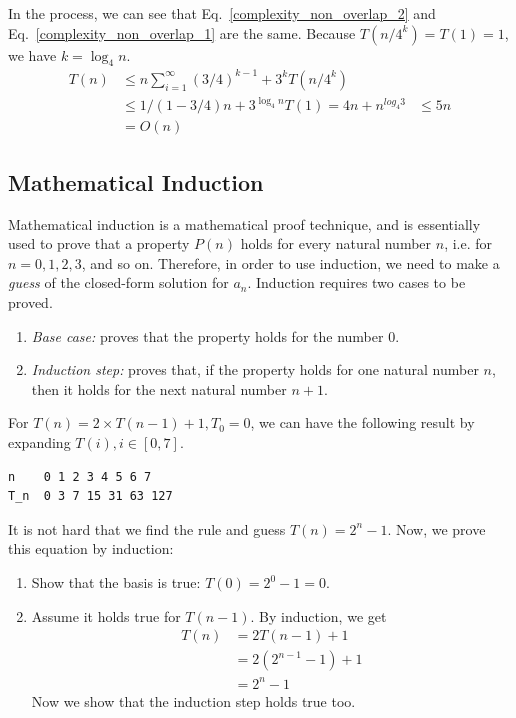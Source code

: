 \documentclass[../main.tex]{subfiles}
\begin{document}
In the process, we can see that Eq.~\ref{complexity_non_overlap_2} and Eq.~\ref{complexity_non_overlap_1} are the same.  Because $T(n/4^k)=T(1)=1$, we have $k=\log_4 n$. 
\begin{align}
\label{complexity_non_overlap_2}
    T(n)&\leq n\sum_{i=1}^{\infty}(3/4)^{k-1}+3^kT(n/4^k)\\
    &\leq 1/(1-3/4)n+3^{\log_4 n} T(1)= 4n+n^{log_4 3}
    &\leq 5n \\
    &=O(n)
\end{align}



\subsection{Mathematical Induction}
Mathematical induction is a mathematical proof technique, and is essentially used to prove that a property $P(n)$ holds for every natural number $n$, i.e. for $n=0, 1, 2, 3$, and so on. Therefore, in order to use induction, we need to make a \textit{guess} of the closed-form solution for $a_n$. Induction requires two cases to be proved. 
\begin{enumerate}
    \item 
 \textit{Base case:} proves that the property holds for the number $0$. 
\item \textit{Induction step:} proves that, if the property holds for one natural number $n$, then it holds for the next natural number $n+1$.
\end{enumerate}

For $T(n)=2\times T(n-1) +1, T_0 = 0$, we can have the following result by expanding $T(i), i \in [0, 7]$.
\begin{lstlisting}[numbers=none]
n    0 1 2 3 4 5 6 7
T_n  0 3 7 15 31 63 127
\end{lstlisting}
It is not hard that we find the rule and guess $T(n) = 2^n-1$. Now, we prove this equation by induction:
\begin{enumerate}
    \item Show that the basis is true: $T(0) = 2^0 -1 = 0$.
    \item Assume it holds true for $T(n-1)$. By induction, we get
    \begin{align}
        T(n)&=2T(n-1) + 1 \\
        &=2 (2^{n-1} - 1) + 1 \\
        &= 2^n -1
    \end{align}
    Now we show that the induction step holds true too. 
\end{enumerate}
\end{document}
